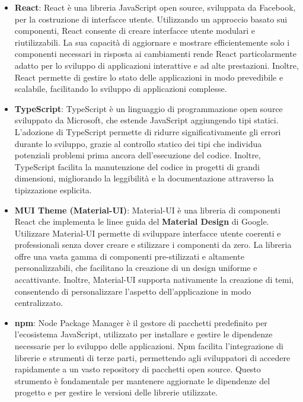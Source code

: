 \begin{itemize}
    \item \textbf{React}: React è una libreria JavaScript open source, sviluppata da Facebook, 
    per la costruzione di interfacce utente. Utilizzando un approccio basato sui componenti, 
    React consente di creare interfacce utente modulari e riutilizzabili. La sua capacità di 
    aggiornare e mostrare efficientemente solo i componenti necessari in risposta ai cambiamenti 
    rende React particolarmente adatto per lo sviluppo di applicazioni interattive e 
    ad alte prestazioni. Inoltre, React permette di gestire lo stato delle applicazioni in modo 
    prevedibile e scalabile, facilitando lo sviluppo di applicazioni complesse. 
    \cite{ReactWikipedia}
 
    \item \textbf{TypeScript}: TypeScript è un linguaggio di programmazione open source sviluppato 
    da Microsoft, che estende JavaScript aggiungendo tipi statici. 
    L'adozione di TypeScript permette di ridurre significativamente gli errori
    durante lo sviluppo, grazie al controllo statico dei tipi che individua potenziali
    problemi prima ancora dell'esecuzione del codice. Inoltre, TypeScript facilita la manutenzione 
    del codice in progetti di grandi dimensioni, migliorando la leggibilità e la documentazione attraverso
    la tipizzazione esplicita. \cite{TypescriptWikipedia}
 
    \item \textbf{MUI Theme (Material-UI)}: Material-UI è una libreria di componenti React 
    che implementa le linee guida del \textbf{Material Design} di Google. Utilizzare 
    Material-UI permette di sviluppare interfacce utente coerenti e professionali 
    senza dover creare e stilizzare i componenti da zero. La libreria offre una vasta 
    gamma di componenti pre-stilizzati e altamente personalizzabili, che facilitano la 
    creazione di un design uniforme e accattivante. Inoltre, Material-UI supporta nativamente 
    la creazione di temi, consentendo di personalizzare l'aspetto dell'applicazione in modo centralizzato.

    \item \textbf{npm}: Node Package Manager è il gestore di pacchetti predefinito 
    per l'ecosistema JavaScript, utilizzato per installare e 
    gestire le dipendenze necessarie per lo sviluppo delle applicazioni. 
    Npm facilita l'integrazione di librerie e strumenti di terze parti, 
    permettendo agli sviluppatori di accedere rapidamente a un vasto repository 
    di pacchetti open source. Questo strumento è fondamentale per mantenere 
    aggiornate le dipendenze del progetto e per gestire le versioni delle librerie utilizzate.


\end{itemize}
